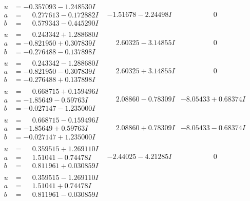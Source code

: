 \documentclass[1p]{elsarticle_modified}
\theoremstyle{definition}
\begin{document}
$$\begin{array}{c|c|c}
\begin{aligned}
u &= -0.357093 - 1.248530 I \\
a &= \phantom{-}0.277613 - 0.172882 I \\
b &= \phantom{-}0.579343 - 0.445290 I\end{aligned}
 & -1.51678 - 2.24498 I & \phantom{-0.000000 } 0 \\ \hline\begin{aligned}
u &= \phantom{-}0.243342 + 1.288680 I \\
a &= -0.821950 + 0.307839 I \\
b &= -0.276488 - 0.137898 I\end{aligned}
 & \phantom{-}2.60325 - 3.14855 I & \phantom{-0.000000 } 0 \\ \hline\begin{aligned}
u &= \phantom{-}0.243342 - 1.288680 I \\
a &= -0.821950 - 0.307839 I \\
b &= -0.276488 + 0.137898 I\end{aligned}
 & \phantom{-}2.60325 + 3.14855 I & \phantom{-0.000000 } 0 \\ \hline\begin{aligned}
u &= \phantom{-}0.668715 + 0.159496 I \\
a &= -1.85649 - 0.59763 I \\
b &= -0.027147 - 1.235000 I\end{aligned}
 & \phantom{-}2.08860 - 0.78309 I & -8.05433 + 0.68374 I \\ \hline\begin{aligned}
u &= \phantom{-}0.668715 - 0.159496 I \\
a &= -1.85649 + 0.59763 I \\
b &= -0.027147 + 1.235000 I\end{aligned}
 & \phantom{-}2.08860 + 0.78309 I & -8.05433 - 0.68374 I \\ \hline\begin{aligned}
u &= \phantom{-}0.359515 + 1.269110 I \\
a &= \phantom{-}1.51041 - 0.74478 I \\
b &= \phantom{-}0.811961 + 0.030859 I\end{aligned}
 & -2.44025 - 4.21285 I & \phantom{-0.000000 } 0 \\ \hline\begin{aligned}
u &= \phantom{-}0.359515 - 1.269110 I \\
a &= \phantom{-}1.51041 + 0.74478 I \\
b &= \phantom{-}0.811961 - 0.030859 I\end{aligned}

\end{array}$$
\end{document}

